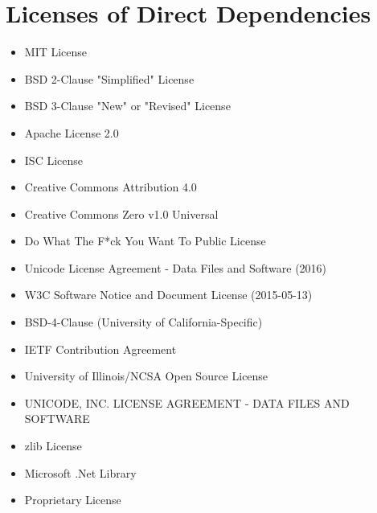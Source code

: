 \section{Licenses of Direct Dependencies}
\begin{itemize}
    \item MIT License
    \item BSD 2-Clause "Simplified" License
    \item BSD 3-Clause "New" or "Revised" License
    \item Apache License 2.0
    \item ISC License
    \item Creative Commons Attribution 4.0
    \item Creative Commons Zero v1.0 Universal
    \item Do What The F*ck You Want To Public License
    \item Unicode License Agreement - Data Files and Software (2016)
    \item W3C Software Notice and Document License (2015-05-13)
    \item BSD-4-Clause (University of California-Specific)
    \item IETF Contribution Agreement
    \item University of Illinois/NCSA Open Source License
    \item UNICODE, INC. LICENSE AGREEMENT - DATA FILES AND SOFTWARE
    \item zlib License
    \item Microsoft .Net Library
    \item Proprietary License
\end{itemize}
